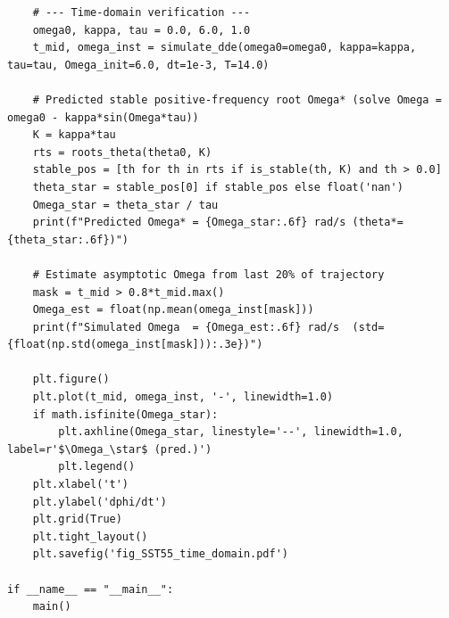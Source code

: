 \documentclass[11pt,a4paper]{article}
\begin{document}
\begin{verbatim}
    # --- Time-domain verification ---
    omega0, kappa, tau = 0.0, 6.0, 1.0
    t_mid, omega_inst = simulate_dde(omega0=omega0, kappa=kappa, tau=tau, Omega_init=6.0, dt=1e-3, T=14.0)

    # Predicted stable positive-frequency root Omega* (solve Omega = omega0 - kappa*sin(Omega*tau))
    K = kappa*tau
    rts = roots_theta(theta0, K)
    stable_pos = [th for th in rts if is_stable(th, K) and th > 0.0]
    theta_star = stable_pos[0] if stable_pos else float('nan')
    Omega_star = theta_star / tau
    print(f"Predicted Omega* = {Omega_star:.6f} rad/s (theta*={theta_star:.6f})")

    # Estimate asymptotic Omega from last 20% of trajectory
    mask = t_mid > 0.8*t_mid.max()
    Omega_est = float(np.mean(omega_inst[mask]))
    print(f"Simulated Omega  = {Omega_est:.6f} rad/s  (std={float(np.std(omega_inst[mask])):.3e})")

    plt.figure()
    plt.plot(t_mid, omega_inst, '-', linewidth=1.0)
    if math.isfinite(Omega_star):
        plt.axhline(Omega_star, linestyle='--', linewidth=1.0, label=r'$\Omega_\star$ (pred.)')
        plt.legend()
    plt.xlabel('t')
    plt.ylabel('dphi/dt')
    plt.grid(True)
    plt.tight_layout()
    plt.savefig('fig_SST55_time_domain.pdf')

if __name__ == "__main__":
    main()

\end{verbatim}
\end{document}
